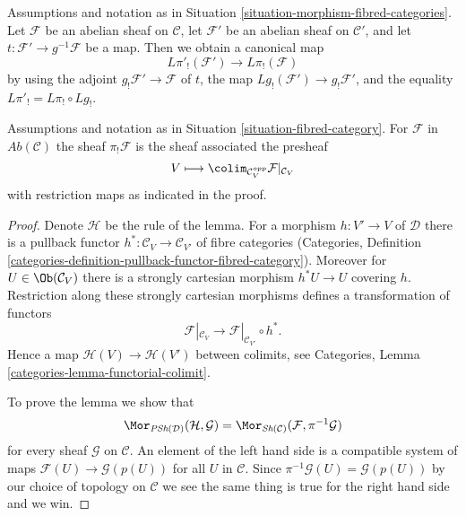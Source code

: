 \begin{remark}
\label{remark-morphism-fibred-categories}
Assumptions and notation as in
Situation \ref{situation-morphism-fibred-categories}.
Let $\mathcal{F}$ be an abelian sheaf on $\mathcal{C}$,
let $\mathcal{F}'$ be an abelian sheaf on $\mathcal{C}'$,
and let $t : \mathcal{F}' \to g^{-1}\mathcal{F}$ be a map.
Then we obtain a canonical map
$$
L\pi'_!(\mathcal{F}') \longrightarrow L\pi_!(\mathcal{F})
$$
by using the adjoint $g_!\mathcal{F}' \to \mathcal{F}$ of $t$,
the map $Lg_!(\mathcal{F}') \to g_!\mathcal{F}'$, and the
equality $L\pi'_! = L\pi_! \circ Lg_!$.
\end{remark}

\begin{lemma}
\label{lemma-compute-pi-shriek}
Assumptions and notation as in
Situation \ref{situation-fibred-category}.
For $\mathcal{F}$ in $\textit{Ab}(\mathcal{C})$
the sheaf $\pi_!\mathcal{F}$ is the
sheaf associated the presheaf
$$
V \longmapsto \colim_{\mathcal{C}_V^{opp}} \mathcal{F}|_{\mathcal{C}_V}
$$
with restriction maps as indicated in the proof.
\end{lemma}

\begin{proof}
Denote $\mathcal{H}$ be the rule of the lemma.
For a morphism $h : V' \to V$ of $\mathcal{D}$ there is a
pullback functor $h^* : \mathcal{C}_V \to \mathcal{C}_{V'}$ of fibre
categories (Categories, Definition
\ref{categories-definition-pullback-functor-fibred-category}).
Moreover for $U \in \Ob(\mathcal{C}_V)$ there is a
strongly cartesian morphism $h^*U \to U$ covering $h$.
Restriction along these strongly cartesian morphisms defines a
transformation of functors
$$
\mathcal{F}|_{\mathcal{C}_V}
\longrightarrow
\mathcal{F}|_{\mathcal{C}_{V'}} \circ h^*.
$$
Hence a map $\mathcal{H}(V) \to \mathcal{H}(V')$ between colimits, see
Categories, Lemma \ref{categories-lemma-functorial-colimit}.

\medskip\noindent
To prove the lemma we show that
$$
\Mor_{\textit{PSh}(\mathcal{D})}(\mathcal{H}, \mathcal{G}) =
\Mor_{\textit{Sh}(\mathcal{C})}(\mathcal{F}, \pi^{-1}\mathcal{G})
$$
for every sheaf $\mathcal{G}$ on $\mathcal{C}$. An element of the
left hand side is a compatible system of maps
$\mathcal{F}(U) \to \mathcal{G}(p(U))$ for all $U$ in $\mathcal{C}$.
Since $\pi^{-1}\mathcal{G}(U) = \mathcal{G}(p(U))$ by our choice
of topology on $\mathcal{C}$ we see the same thing is true for the
right hand side and we win.
\end{proof}





